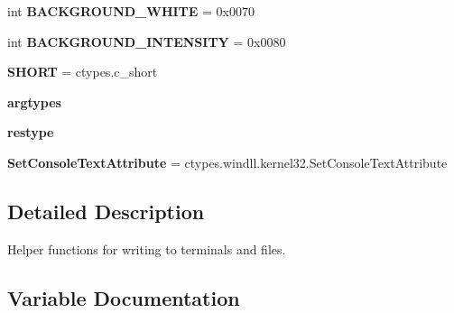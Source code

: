 \begin{DoxyCompactItemize}
\item 
\mbox{\label{namespacepy_1_1__io_1_1terminalwriter_ae02bd3651cfc5c9a342c11ea2a13bbf6}} 
int {\bfseries B\+A\+C\+K\+G\+R\+O\+U\+N\+D\+\_\+\+W\+H\+I\+TE} = 0x0070
\item 
\mbox{\label{namespacepy_1_1__io_1_1terminalwriter_aae1d022969f3d36fa0ca532b9940488f}} 
int {\bfseries B\+A\+C\+K\+G\+R\+O\+U\+N\+D\+\_\+\+I\+N\+T\+E\+N\+S\+I\+TY} = 0x0080
\item 
\mbox{\label{namespacepy_1_1__io_1_1terminalwriter_a65a8c675ec17e11819fe138a79c4849e}} 
{\bfseries S\+H\+O\+RT} = ctypes.\+c\+\_\+short
\item 
\mbox{\label{namespacepy_1_1__io_1_1terminalwriter_acd69dab8113693275a14438e8d481c97}} 
{\bfseries argtypes}
\item 
\mbox{\label{namespacepy_1_1__io_1_1terminalwriter_a1366bbd4a460971598bd059d5129bd9b}} 
{\bfseries restype}
\item 
\mbox{\label{namespacepy_1_1__io_1_1terminalwriter_a67749fb5a4551c1a65bff8ea0e0896ad}} 
{\bfseries Set\+Console\+Text\+Attribute} = ctypes.\+windll.\+kernel32.\+Set\+Console\+Text\+Attribute
\end{DoxyCompactItemize}


\subsection{Detailed Description}
\begin{DoxyVerb}Helper functions for writing to terminals and files.\end{DoxyVerb}
 

\subsection{Variable Documentation}
\mbox{\label{namespacepy_1_1__io_1_1terminalwriter_a3960fd755b7375495f64f8e1db6d2a09}} 
